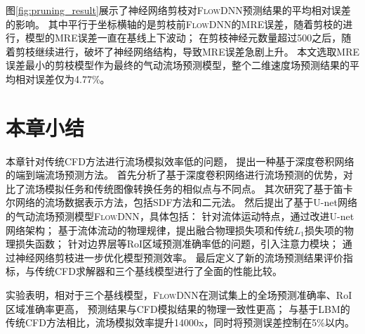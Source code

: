 图\ref{fig:pruning_result}展示了神经网络剪枝对\textsc{FlowDNN}预测结果的平均相对误差的影响。
其中平行于坐标横轴的是剪枝前\textsc{FlowDNN}的MRE误差，随着剪枝的进行，模型的MRE误差一直在基线上下波动；
在剪枝神经元数量超过500之后，随着剪枝继续进行，破坏了神经网络结构，导致MRE误差急剧上升。
本文选取MRE误差最小的剪枝模型作为最终的气动流场预测模型，整个二维速度场预测结果的平均相对误差仅为4.77\%。


\section{本章小结}

本章针对传统CFD方法进行流场模拟效率低的问题，
提出一种基于深度卷积网络的端到端流场预测方法。
首先分析了基于深度卷积网络进行流场预测的优势，对比了流场模拟任务和传统图像转换任务的相似点与不同点。
其次研究了基于笛卡尔网络的流场数据表示方法，包括SDF方法和二元法。
然后提出了基于U-net网络的气动流场预测模型\textsc{FlowDNN}，具体包括：
针对流体运动特点，通过改进U-net网络架构；
基于流体流动的物理规律，提出融合物理损失项和传统$L_1$损失项的物理损失函数；
针对边界层等RoI区域预测准确率低的问题，引入注意力模块；
通过神经网络剪枝进一步优化模型预测效率。
最后定义了新的流场预测结果评价指标，与传统CFD求解器和三个基线模型进行了全面的性能比较。

实验表明，相对于三个基线模型，\textsc{FlowDNN}在测试集上的全场预测准确率、RoI区域准确率更高，
预测结果与CFD模拟结果的物理一致性更高；
与基于LBM的传统CFD方法相比，流场模拟效率提升14000x，同时将预测误差控制在5\%以内。


